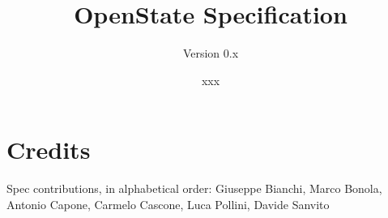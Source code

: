 \documentclass[a4paper,11pt,twoside=semi]{scrreprt}
\title{OpenState Specification}
\subtitle{Version 0.x}
\author{}
\date{xxx}
\begin{document}
\maketitle


\tableofcontents

\newpage
\clearpage










\section*{Credits}
Spec contributions, in alphabetical order: Giuseppe Bianchi, Marco Bonola, Antonio Capone, Carmelo Cascone, Luca Pollini, Davide Sanvito

\end{document}
